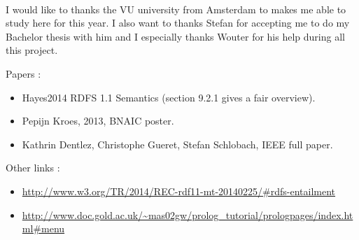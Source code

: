 \documentclass{article}
\newenvironment{itemh}[0]{\begin{itemize}[label=$\heartsuit$, font=\color{mygray} \small]}{\end{itemize}}
\begin{document}
		\paragraph{}
			I would like to thanks the VU university from Amsterdam to makes me able to study here for this year.
			I also want to thanks Stefan for accepting me to do my Bachelor thesis with him
			and I especially thanks Wouter for his help during all this project.

\newpage


	Papers :
		\begin{itemh}
			\item Hayes2014 RDFS 1.1 Semantics (section 9.2.1 gives a fair overview).
			\item Pepijn Kroes, 2013, BNAIC poster.
			\item Kathrin Dentlez, Christophe Gueret, Stefan Schlobach, IEEE full paper.
		\end{itemh}
	Other links :
		\begin{itemh}
			\item\url{http://www.w3.org/TR/2014/REC-rdf11-mt-20140225/#rdfs-entailment}
			\item \url{http://www.doc.gold.ac.uk/~mas02gw/prolog_tutorial/prologpages/index.html#menu}
		\end{itemh}
\end{document}
